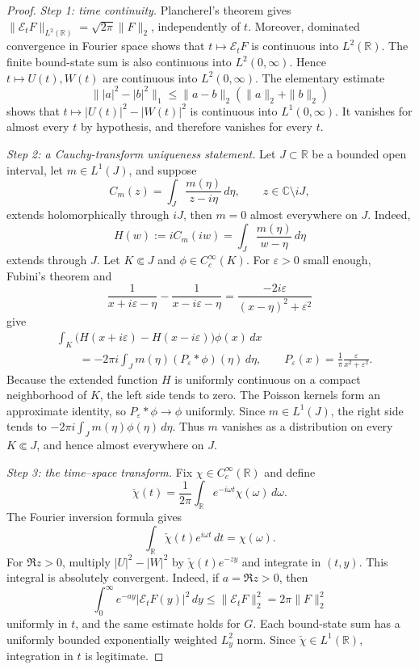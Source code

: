 \documentclass[11pt]{amsart}
\numberwithin{equation}{section}
\theoremstyle{remark}
\newcommand{\R}{\mathbb R}
\newcommand{\C}{\mathbb C}
\begin{document}
\begin{proof}
\emph{Step 1: time continuity.}
Plancherel's theorem gives
$\|\mathcal E_t F\|_{L^2(\R)}=\sqrt{2\pi}\|F\|_2$, independently of $t$.
Moreover, dominated convergence in Fourier space shows that
$t\mapsto\mathcal E_t F$ is continuous into $L^2(\R)$.  The finite bound-state
sum is also continuous into $L^2(0,\infty)$.  Hence
$t\mapsto U(t),W(t)$ are continuous into $L^2(0,\infty)$.  The elementary
estimate
\[
 \||a|^2-|b|^2\|_1\le\|a-b\|_2(\|a\|_2+\|b\|_2)
\]
shows that $t\mapsto |U(t)|^2-|W(t)|^2$ is continuous into $L^1(0,\infty)$.
It vanishes for almost every $t$ by hypothesis, and therefore vanishes for
every $t$.

\emph{Step 2: a Cauchy-transform uniqueness statement.}
Let $J\subset\R$ be a bounded open interval, let $m\in L^1(J)$, and suppose
\[
 C_m(z)=\int_J\frac{m(\eta)}{z-i\eta}\,d\eta,
 \qquad z\in\C\setminus iJ,
\]
extends holomorphically through $iJ$, then $m=0$ almost everywhere on $J$.
Indeed,
\[
 H(w):=iC_m(iw)=\int_J\frac{m(\eta)}{w-\eta}\,d\eta
\]
extends through $J$.  Let $K\Subset J$ and
$\phi\in C_c^\infty(K)$.  For $\varepsilon>0$ small enough, Fubini's theorem
and
\[
 \frac1{x+i\varepsilon-\eta}-\frac1{x-i\varepsilon-\eta}
 =\frac{-2i\varepsilon}{(x-\eta)^2+\varepsilon^2}
\]
give
\begin{align*}
 &\int_K\bigl(H(x+i\varepsilon)-H(x-i\varepsilon)\bigr)\phi(x)\,dx\\
 &\qquad=-2\pi i\int_J m(\eta)(P_\varepsilon*\phi)(\eta)\,d\eta,
 \qquad
 P_\varepsilon(x)=\frac1\pi\frac{\varepsilon}{x^2+\varepsilon^2}.
\end{align*}
Because the extended function $H$ is uniformly continuous on a compact
neighborhood of $K$, the left side tends to zero.  The Poisson kernels form
an approximate identity, so $P_\varepsilon*\phi\to\phi$ uniformly.  Since
$m\in L^1(J)$, the right side tends to
$-2\pi i\int_J m(\eta)\phi(\eta)\,d\eta$.  Thus $m$ vanishes as a
distribution on every $K\Subset J$, and hence almost everywhere on $J$.

\emph{Step 3: the time--space transform.}
Fix $\chi\in C_c^\infty(\R)$ and define
\[
 \check\chi(t)=\frac1{2\pi}\int_\R e^{-i\omega t}\chi(\omega)\,d\omega.
\]
The Fourier inversion formula gives
\begin{equation}
 \int_\R \check\chi(t)e^{i\omega t}\,dt=\chi(\omega).
 \label{eq:half-line-frequency-selector}
\end{equation}
For $\Re z>0$, multiply $|U|^2-|W|^2$ by
$\check\chi(t)e^{-zy}$ and integrate in $(t,y)$.  This integral is absolutely
convergent.  Indeed, if $a=\Re z>0$, then
\[
 \int_0^\infty e^{-ay}|\mathcal E_t F(y)|^2\,dy
 \le\|\mathcal E_t F\|_2^2=2\pi\|F\|_2^2
\]
uniformly in $t$, and the same estimate holds for $G$.  Each bound-state sum
has a uniformly bounded exponentially weighted $L^2_y$ norm.  Since
$\check\chi\in L^1(\R)$, integration in $t$ is legitimate.


\end{proof}
\end{document}
